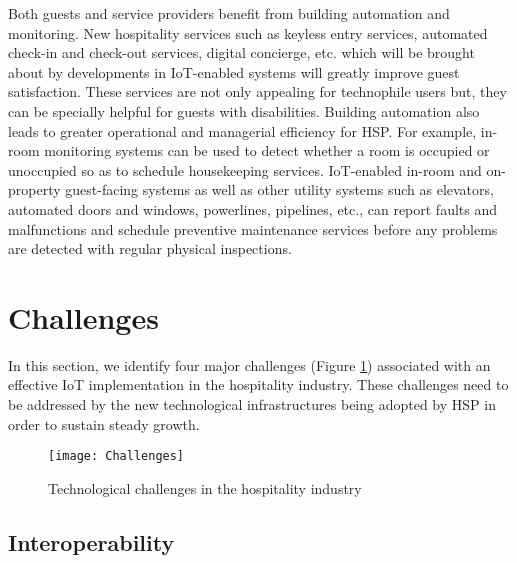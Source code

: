 \documentclass[10pt,journal,letterpaper]{IEEEtran}
\begin{document}
{Both guests and service providers benefit from building automation and monitoring. New hospitality services such as keyless entry services, automated check-in and check-out services, digital concierge, etc. which will be brought about by developments in IoT-enabled systems will greatly improve guest satisfaction. These services are not only appealing for technophile users but, they can be specially helpful for guests with disabilities. Building automation also leads to greater operational and managerial efficiency for HSP. For example, in-room monitoring systems can be used to detect whether a room is occupied or unoccupied so as to schedule housekeeping services. IoT-enabled in-room and on-property guest-facing systems as well as other utility systems such as elevators, automated doors and windows, powerlines, pipelines, etc., can report faults and malfunctions and schedule preventive maintenance services before any problems are detected with regular physical inspections\cite{Vermesan_IoTForMaintenance_2014}.
%
%
\section{Challenges}
\label{section_challenges}

In this section, we identify four major challenges (Figure \ref{figure_Challenges}) associated with an effective IoT implementation in the hospitality industry. These challenges need to be addressed by the new technological infrastructures being adopted by HSP in order to sustain steady growth.

\begin{figure}[!t]
\centering
\texttt{[image: Challenges]}
\caption{Technological challenges in the hospitality industry}
\label{figure_Challenges}
\end{figure}


\subsection*{Interoperability}

}
\end{document}
